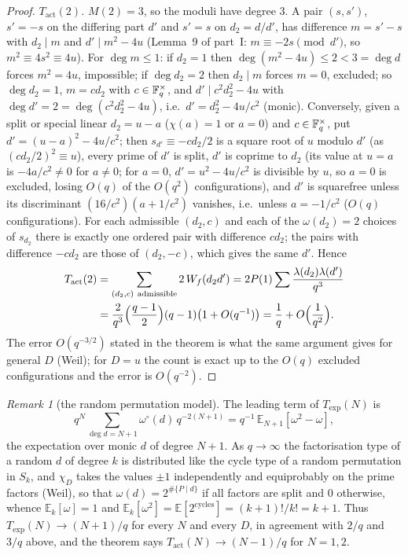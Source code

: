 \documentclass[11pt,a4paper]{article}
\theoremstyle{remark}\newtheorem{remark}[theorem]{Remark}
\begin{document}
\begin{proof}
\emph{$T_{\mathrm{act}}(2)$.} $M(2)=3$, so the moduli have degree $3$. A pair $(s,s')$, $s'=-s$ on the differing part $d'$
and $s'=s$ on $d_2=d/d'$, has difference $m=s'-s$ with $d_2\mid m$ and $d'\mid m^2-4u$ (Lemma~9 of part~I:
$m\equiv-2s\pmod{d'}$, so $m^2\equiv4s^2\equiv4u$). For $\deg m\le1$: if $d_2=1$ then $\deg(m^2-4u)\le2<3=\deg d$
forces $m^2=4u$, impossible; if $\deg d_2=2$ then $d_2\mid m$ forces $m=0$, excluded; so $\deg d_2=1$, $m=cd_2$ with
$c\in\mathbb{F}_q^\times$, and $d'\mid c^2d_2^2-4u$ with $\deg d'=2=\deg(c^2d_2^2-4u)$, i.e.\ $d'=d_2^2-4u/c^2$ (monic). Conversely,
given a split or special linear $d_2=u-a$ ($\chi(a)=1$ or $a=0$) and $c\in\mathbb{F}_q^\times$, put $d'=(u-a)^2-4u/c^2$; then
$s_{d'}\equiv-cd_2/2$ is a square root of $u$ modulo $d'$ (as $(cd_2/2)^2\equiv u$), every prime of $d'$ is split, $d'$ is
coprime to $d_2$ (its value at $u=a$ is $-4a/c^2\ne0$ for $a\ne0$; for $a=0$, $d'=u^2-4u/c^2$ is divisible by $u$, so
$a=0$ is excluded, losing $O(q)$ of the $O(q^2)$ configurations), and $d'$ is squarefree unless its discriminant
$(16/c^2)(a+1/c^2)$ vanishes, i.e.\ unless $a=-1/c^2$ ($O(q)$ configurations). For each admissible $(d_2,c)$ and each
of the $\omega(d_2)=2$ choices of $s_{d_2}$ there is exactly one ordered pair with difference $cd_2$; the pairs with
difference $-cd_2$ are those of $(d_2,-c)$, which gives the same $d'$. Hence
\[
\begin{aligned}
T_{\mathrm{act}}(2)&=\sum_{(d_2,c)\ \mathrm{admissible}}2\,W_f(d_2d')=2P(1)\sum\frac{\lambda(d_2)\lambda(d')}{q^3}\\
&=\frac{2}{q^3}\Bigl(\frac{q-1}2\Bigr)(q-1)\bigl(1+O(q^{-1})\bigr)=\frac1q+O\Bigl(\frac1{q^2}\Bigr).
\end{aligned}
\]
The error $O(q^{-3/2})$ stated in the theorem is what the same argument gives for general $D$ (Weil); for $D=u$
the count is exact up to the $O(q)$ excluded configurations and the error is $O(q^{-2})$.
\end{proof}

\begin{remark}[the random permutation model]\label{rem:perm}
The leading term of $T_{\exp}(N)$ is
\[
q^N\sum_{\deg d=N+1}\omega^\circ(d)\,q^{-2(N+1)}=q^{-1}\,\mathbb E_{N+1}[\omega^2-\omega],
\]
the
expectation over monic $d$ of degree $N+1$. As $q\to\infty$ the factorisation type of a random $d$ of degree $k$ is
distributed like the cycle type of a random permutation in $S_k$, and $\chi_D$ takes the values $\pm1$
independently and equiprobably on the prime factors (Weil), so that $\omega(d)=2^{\#\{P\mid d\}}$ if all factors are
split and $0$ otherwise, whence $\mathbb E_k[\omega]=1$ and $\mathbb E_k[\omega^2]=\mathbb E[2^{\mathrm{cycles}}]=(k+1)!/k!=k+1$. Thus
$T_{\exp}(N)\to(N+1)/q$ for every $N$ and every $D$, in agreement with $2/q$ and $3/q$ above, and the theorem says
$T_{\mathrm{act}}(N)\to(N-1)/q$ for $N=1,2$.
\end{remark}
\end{document}
